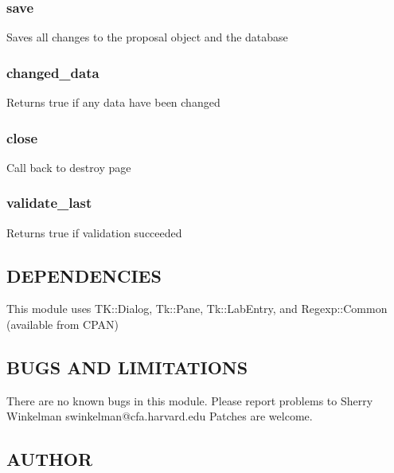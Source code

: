 \documentclass{article}
\begin{document}
\subsubsection*{save\label{EditPage_save}}


Saves all changes to the proposal object and the database

\subsubsection*{changed\_data\label{EditPage_changed_data}}


Returns true if any data have been changed

\subsubsection*{close\label{EditPage_close}}


Call back to destroy page

\subsubsection*{validate\_last\label{EditPage_validate_last}}


Returns true if validation succeeded

\subsection*{DEPENDENCIES\label{EditPage_DEPENDENCIES}}


This module uses TK::Dialog, Tk::Pane, Tk::LabEntry,
and Regexp::Common (available from CPAN)

\subsection*{BUGS AND LIMITATIONS\label{EditPage_BUGS_AND_LIMITATIONS}}


There are no known bugs in this module.
Please report problems to Sherry Winkelman swinkelman@cfa.harvard.edu
Patches are welcome.

\subsection*{AUTHOR\label{EditPage_AUTHOR}}
\end{document}
